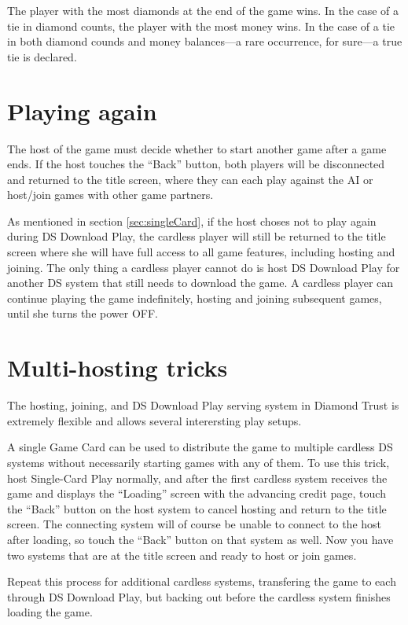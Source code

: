 \documentclass[8pt]{extbook}
\begin{document}
The player with the most diamonds at the end of the game wins.  In the case of a tie in diamond counts, the player with the most money wins.  In the case of a tie in both diamond counds and money balances---a rare occurrence, for sure---a true tie is declared.



\section{Playing again}
The host of the game must decide whether to start another game after a game ends.  If the host touches the ``Back'' button, both players will be disconnected and returned to the title screen, where they can each play against the AI or host/join games with other game partners.

As mentioned in section \ref{sec:singleCard}, if the host choses not to play again during DS Download Play, the cardless player will still be returned to the title screen where she will have full access to all game features, including hosting and joining.  The only thing a cardless player cannot do is host DS Download Play for another DS system that still needs to download the game.  A cardless player can continue playing the game indefinitely, hosting and joining subsequent games, until she turns the power OFF.


\section{Multi-hosting tricks}
\label{sec:multiHosting}
The hosting, joining, and DS Download Play serving system in Diamond Trust is extremely flexible and allows several interersting play setups.

A single Game Card can be used to distribute the game to multiple cardless DS systems without necessarily starting games with any of them.  To use this trick, host Single-Card Play normally, and after the first cardless system receives the game and displays the ``Loading'' screen with the advancing credit page, touch the ``Back'' button on the host system to cancel hosting and return to the title screen.  The connecting system will of course be unable to connect to the host after loading, so touch the ``Back'' button on that system as well.  Now you have two systems that are at the title screen and ready to host or join games.

Repeat this process for additional cardless systems, transfering the game to each through DS Download Play, but backing out before the cardless system finishes loading the game.
\end{document}

